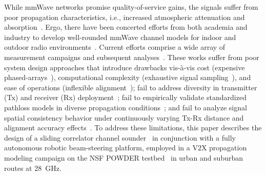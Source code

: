 \documentclass[10pt, twocolumn]{IEEEtran}
\begin{document}
While mmWave networks promise quality-of-service gains, the signals suffer from poor propagation characteristics, i.e., increased atmospheric attenuation and absorption~\cite{Rappaport}. Ergo, there have been concerted efforts from both academia and industry to develop well-rounded mmWave channel models for indoor and outdoor radio environments~\cite{Foliage, Indoor60G, NISTModeling}. Current efforts comprise a wide array of measurement campaigns and subsequent analyses~\cite{Agile-Link, Harvard, Purdue, Foliage, MolischSpatialOutdoor, Outdoor28G, Commercial, MacCartneySpatialStatistics}. These works suffer from poor system design approaches that introduce drawbacks vis-\`{a}-vis cost (expensive phased-arrays~\cite{Agile-Link}), computational complexity (exhaustive signal sampling~\cite{Agile-Link}), and ease of operations (inflexible alignment~\cite{Foliage}); fail to address diversity in transmitter (Tx) and receiver (Rx) deployment~\cite{Purdue, MolischSpatialOutdoor}; fail to empirically validate standardized pathloss models in diverse propagation conditions~\cite{Outdoor28G, Commercial}; and fail to analyze signal spatial consistency behavior under continuously varying Tx-Rx distance and alignment accuracy effects~\cite{Indoor60G, MolischSpatialOutdoor, MacCartneySpatialStatistics}. To address these limitations, this paper describes the design of a sliding correlator channel sounder~\cite{Purdue} in conjunction with a fully autonomous robotic beam-steering platform, employed in a V$2$X propagation modeling campaign on the NSF POWDER testbed~\cite{POWDER} in urban and suburban routes at \SI{28}{\giga\hertz}.
\end{document}
